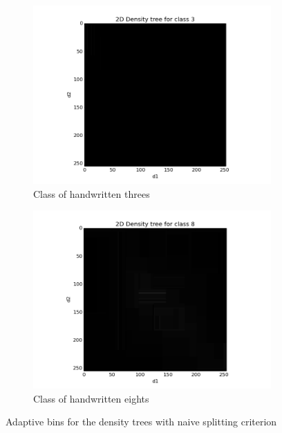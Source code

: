 \documentclass{article}
\begin{document}
\begin{figure}[ht]
        \centering
        \begin{subfigure}[b]{0.5\textwidth}
                \includegraphics[width=\textwidth]{../naiveDT3.png}
                \caption{Class of handwritten threes}
        \end{subfigure}%
        \begin{subfigure}[b]{0.5\textwidth}
                \includegraphics[width=\textwidth]{../naiveDT8.png}
                \caption{Class of handwritten eights}
        \end{subfigure}
        \caption{Adaptive bins for the density trees with naive splitting criterion}
        \label{img3}
\end{figure}
\end{document}

